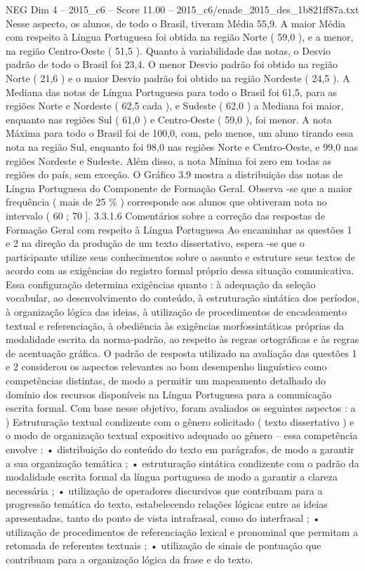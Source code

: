 \begin{textsample}{NEG Dim 4 – 2015\_c6 – Score 11.00 – 2015\_c6/enade\_2015\_des\_1b821ff87a.txt}
Nesse aspecto, os alunos, de todo o Brasil, tiveram Média 55,9.
A maior Média com respeito à Língua Portuguesa foi obtida na região Norte ( 59,0 ), e a menor, na região Centro-Oeste ( 51,5 ).
Quanto à variabilidade das notas, o Desvio padrão de todo o Brasil foi 23,4.
O menor Desvio padrão foi obtido na região Norte ( 21,6 ) e o maior Desvio padrão foi obtido na região Nordeste ( 24,5 ).
A Mediana das notas de Língua Portuguesa para todo o Brasil foi 61,5, para as regiões Norte e Nordeste ( 62,5 cada ), e Sudeste ( 62,0 ) a Mediana foi maior, enquanto nas regiões Sul ( 61,0 ) e Centro-Oeste ( 59,0 ), foi menor.
A nota Máxima para todo o Brasil foi de 100,0, com, pelo menos, um aluno tirando essa nota na região Sul, enquanto foi 98,0 nas regiões Norte e Centro-Oeste, e 99,0 nas regiões Nordeste e Sudeste.
Além disso, a nota Mínima foi zero em todas as regiões do país, sem exceção.
O Gráfico 3.9 mostra a distribuição das notas de Língua Portuguesa do Componente de Formação Geral.
Observa -se que a maior frequência ( mais de 25 \% ) corresponde aos alunos que obtiveram nota no intervalo ( 60 ; 70 ]. 3.3.1.6 Comentários sobre a correção das respostas de Formação Geral com respeito à Língua Portuguesa Ao encaminhar as questões 1 e 2 na direção da produção de um texto dissertativo, espera -se que o participante utilize seus conhecimentos sobre o assunto e estruture seus textos de acordo com as exigências do registro formal próprio dessa situação comunicativa.
Essa configuração determina exigências quanto : à adequação da seleção vocabular, ao desenvolvimento do conteúdo, à estruturação sintática dos períodos, à organização lógica das ideias, à utilização de procedimentos de encadeamento textual e referenciação, à obediência às exigências morfossintáticas próprias da modalidade escrita da norma-padrão, ao respeito às regras ortográficas e às regras de acentuação gráfica.
O padrão de resposta utilizado na avaliação das questões 1 e 2 considerou os aspectos relevantes ao bom desempenho linguístico como competências distintas, de modo a permitir um mapeamento detalhado do domínio dos recursos disponíveis na Língua Portuguesa para a comunicação escrita formal.
Com base nesse objetivo, foram avaliados os seguintes aspectos : a ) Estruturação textual condizente com o gênero solicitado ( texto dissertativo ) e o modo de organização textual expositivo adequado ao gênero – essa competência envolve : • distribuição do conteúdo do texto em parágrafos, de modo a garantir a sua organização temática ; • estruturação sintática condizente com o padrão da modalidade escrita formal da língua portuguesa de modo a garantir a clareza necessária ; • utilização de operadores discursivos que contribuam para a progressão temática do texto, estabelecendo relações lógicas entre as ideias apresentadas, tanto do ponto de vista intrafrasal, como do interfrasal ; • utilização de procedimentos de referenciação lexical e pronominal que permitam a retomada de referentes textuais ; • utilização de sinais de pontuação que contribuam para a organização lógica da frase e do texto.

\end{textsample}
